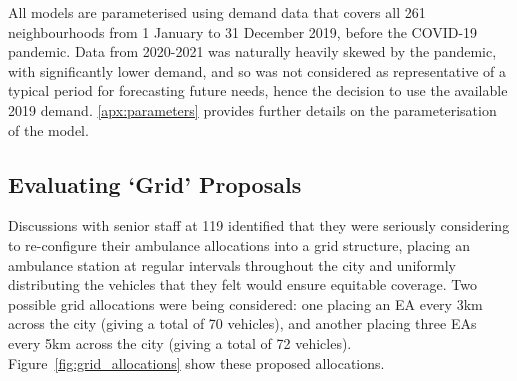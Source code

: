 \documentclass[preprint,12pt]{elsarticle}
\begin{document}
All models are parameterised using demand data that covers all 261
neighbourhoods from 1 January to 31 December 2019, before the COVID-19
pandemic. Data from 2020-2021 was naturally heavily skewed by the pandemic,
with significantly lower demand, and so was not considered as representative
of a typical period for forecasting future needs, hence the decision to use
the available 2019 demand. \ref{apx:parameters} provides further details on the
parameterisation of the model.


\subsection{Evaluating `Grid' Proposals}\label{sec:analysis_grid}
Discussions with senior staff at 119 identified that they were seriously
considering to re-configure their ambulance allocations into a grid structure,
placing an ambulance station at regular intervals throughout the city and
uniformly distributing the vehicles that they felt would ensure equitable
coverage. Two
possible grid allocations were being considered: one placing an EA every 3km
across the city (giving a total of 70 vehicles), and another placing three EAs
every 5km across the city (giving a total of 72 vehicles).
Figure~\ref{fig:grid_allocations} show these proposed allocations.
\end{document}
